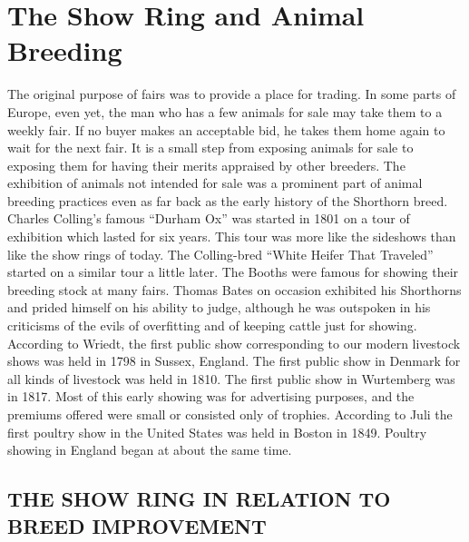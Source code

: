 \chapter{The Show Ring and Animal Breeding}
\label{cha:Lush_Chapter_19}

The original purpose of fairs was to provide a place for trading. In
some parts of Europe, even yet, the man who has a few animals for sale
may take them to a weekly fair. If no buyer makes an acceptable bid, he
takes them home again to wait for the next fair. It is a small step from
exposing animals for sale to exposing them for having their merits
appraised by other breeders. The exhibition of animals not intended
for sale was a prominent part of animal breeding practices even as far
back as the early history of the Shorthorn breed. Charles Colling's
famous ``Durham Ox'' was started in 1801 on a tour of exhibition which
lasted for six years. This tour was more like the sideshows than like the
show rings of today. The Colling-bred ``White Heifer That Traveled''
started on a similar tour a little later. The Booths were famous for showing
their breeding stock at many fairs. Thomas Bates on occasion exhibited
his Shorthorns and prided himself on his ability to judge, although
he was outspoken in his criticisms of the evils of overfitting and of keeping
cattle just for showing. According to Wriedt, the first public show
corresponding to our modern livestock shows was held in 1798 in Sussex,
England. The first public show in Denmark for all kinds of livestock
was held in 1810. The first public show in Wurtemberg was in
1817. Most of this early showing was for advertising purposes, and the
premiums offered were small or consisted only of trophies. According to
Juli the first poultry show in the United States was held in Boston in
1849. Poultry showing in England began at about the same time.

\section*{THE SHOW RING IN RELATION TO BREED IMPROVEMENT}

